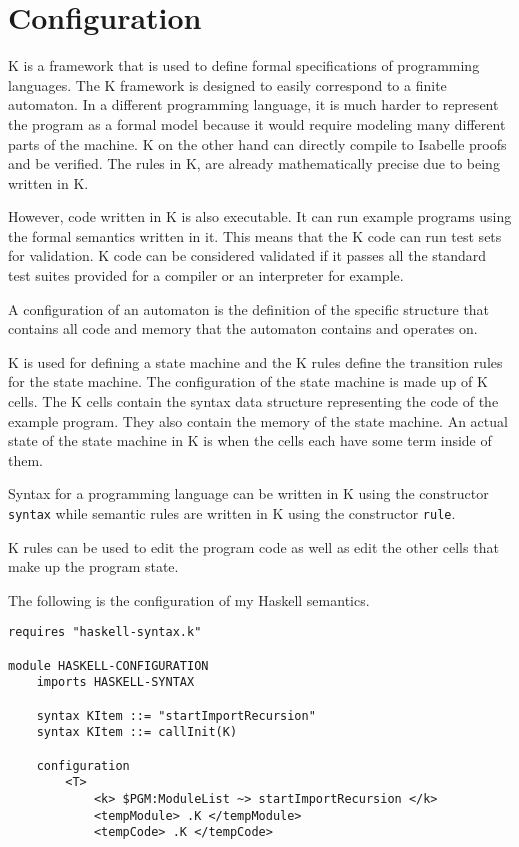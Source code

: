\chapter{Configuration}
K is a framework that is used to define formal specifications of programming languages. The K framework is designed to easily correspond to a finite automaton. In a different programming language, it is much harder to represent the program as a formal model because it would require modeling many different parts of the machine. K on the other hand can directly compile to Isabelle proofs and be verified. The rules in K, are already mathematically precise due to being written in K.

However, code written in K is also executable. It can run example programs using the formal semantics written in it. This means that the K code can run test sets for validation. K code can be considered validated if it passes all the standard test suites provided for a compiler or an interpreter for example.

A configuration of an automaton is the definition of the specific structure that contains all code and memory that the automaton contains and operates on.

K is used for defining a state machine and the K rules define the transition rules for the state machine. The configuration of the state machine is made up of K cells. The K cells contain the syntax data structure representing the code of the example program. They also contain the memory of the state machine. An actual state of the state machine in K is when the cells each have some term inside of them.

Syntax for a programming language can be written in K using the constructor \texttt{syntax} while semantic rules are written in K using the constructor \texttt{rule}.

K rules can be used to edit the program code as well as edit the other cells that make up the program state.

The following is the configuration of my Haskell semantics.
\begin{lstlisting}
requires "haskell-syntax.k"

module HASKELL-CONFIGURATION
    imports HASKELL-SYNTAX

    syntax KItem ::= "startImportRecursion"
    syntax KItem ::= callInit(K)

    configuration 
        <T>
            <k> $PGM:ModuleList ~> startImportRecursion </k>
            <tempModule> .K </tempModule>
            <tempCode> .K </tempCode>
\end{lstlisting}

